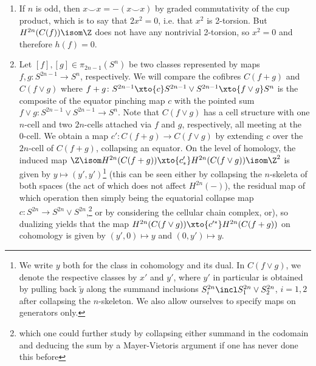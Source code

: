 \begin{solution}
	\leavevmode
	\begin{enumerate}
		\item If $n$ is odd, then $x \smile x = -(x \smile x)$ by graded commutativity of the cup product, which is to say that $2 x^2 = 0$, i.e. that $x^2$ is 2-torsion. 
			But $H^{2n}(C(f)) \isom \Z$ does not have any nontrivial 2-torsion, so $x^2 = 0$ and therefore $h(f) = 0$.
		\item Let $[f], [g] \in \pi_{2n - 1}(S^n)$ be two classes represented by maps $f, g\colon S^{2n - 1} \to S^n$, respectively.
			We will compare the cofibres $C(f + g)$ and $C(f \vee g)$ where $f + g\colon S^{2n - 1} \xto{c} S^{2n - 1} \vee S^{2n - 1} \xto{f \vee g} S^n$ is the composite of the equator pinching map $c$ with the pointed sum $f \vee g\colon S^{2n - 1} \vee S^{2n - 1} \to S^n$. 
			Note that $C(f \vee g)$ has a cell structure with one $n$-cell and two $2n$-cells attached via $f$ and $g$, respectively, all meeting at the 0-cell.
			We obtain a map $c'\colon C(f + g) \to C(f \vee g)$ by extending $c$ over the $2n$-cell of $C(f + g)$, collapsing an equator.
			On the level of homology, the induced map $\Z \isom H^{2n}(C(f + g)) \xto{c'_*} H^{2n}(C(f \vee g)) \isom \Z^2$ is given by $y \mapsto (y', y')$\footnote{We write $y$ both for the class in cohomology and its dual. In $C(f \vee g)$, we denote the respective classes by $x'$ and $y'$, where $y'$ in particular is obtained by pulling back $\tilde{y}$ along the summand inclusions $S_i^{2n} \incl S_1^{2n} \vee S_2^{2n}$, $i = 1, 2$ after collapsing the $n$-skeleton. We also allow ourselves to specify maps on generators only.} (this can be seen either by collapsing the $n$-skeleta of both spaces (the act of which does not affect $H^{2n}({{-}})$), the residual map of which operation then simply being the equatorial collapse map $c\colon S^{2n} \to S^{2n} \vee S^{2n}$,\footnote{which one could further study by collapsing either summand in the codomain and deducing the sum by a Mayer-Vietoris argument if one has never done this before} or by considering the cellular chain complex, or\textellipsis{}), so dualizing yields that the map $H^{2n}(C(f \vee g)) \xto{c'^*} H^{2n}(C(f + g))$ on cohomology is given by $(y', 0) \mapsto y$ and $(0, y') \mapsto y$.


\end{enumerate}
\end{solution}
